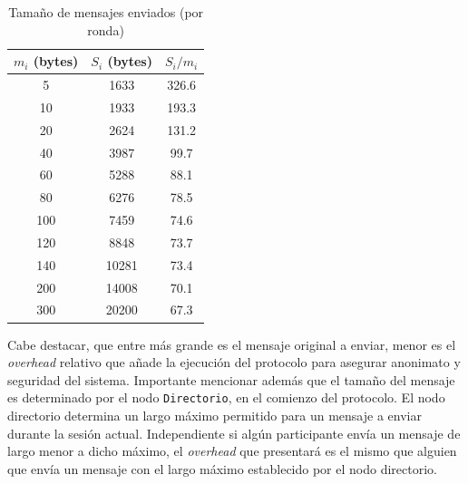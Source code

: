 \begin{table}[h!]
\centering
\begin{tabular}[h!]{|c|c|c|}
\hline
$m_i$ (bytes) & $S_i$ (bytes) & $S_i / m_i$ \\ \hline
5                                   & 1633                               & 326.6       \\ \hline
10                                  & 1933                               & 193.3       \\ \hline
20                                  & 2624                               & 131.2       \\ \hline
40                                  & 3987                               & 99.7        \\ \hline
60                                  & 5288                               & 88.1        \\ \hline
80                                  & 6276                               & 78.5        \\ \hline
100                                 & 7459                               & 74.6        \\ \hline
120                                 & 8848                               & 73.7        \\ \hline
140                                 & 10281                              & 73.4        \\ \hline
200                                 & 14008                              & 70.1        \\ \hline
300                                 & 20200                              & 67.3        \\ \hline
\end{tabular}
\caption{Tamaño de mensajes enviados (por ronda)}
\label{table:message_sizes_table}
\end{table}

Cabe destacar, que entre más grande es el mensaje original a enviar, menor es 
el \emph{overhead} relativo que añade la ejecución del protocolo para asegurar 
anonimato y seguridad del sistema. Importante mencionar además que el tamaño 
del mensaje es determinado por el nodo \texttt{Directorio}, en el comienzo del 
protocolo. El nodo directorio determina un largo máximo permitido para un 
mensaje a enviar durante la sesión actual. Independiente si algún participante 
envía un mensaje de largo menor a dicho máximo, el \emph{overhead} que 
presentará es el mismo que alguien que envía un mensaje con el largo máximo 
establecido por el nodo directorio.


